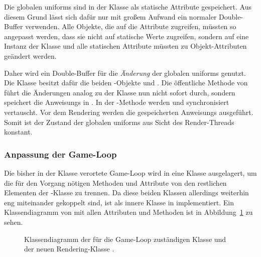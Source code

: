 Die globalen \glspl{uniform} sind in der Klasse \classGlobalUniforms{} als statische Attribute gespeichert. Aus diesem Grund lässt sich dafür nur mit großem Aufwand ein normaler Double-Buffer verwenden. Alle Objekte, die auf die Attribute zugreifen, müssten so angepasst werden, dass sie nicht auf statische Werte zugreifen, sondern auf eine Instanz der Klasse und alle statischen Attribute müssten zu Objekt-Attributen geändert werden.

Daher wird ein Double-Buffer für die \emph{Änderung} der globalen \glspl{uniform} genutzt. Die Klasse \classMasterRenderer{} besitzt dafür die beiden \classRunnable{}-Objekte  und . Die öffentliche Methode  von \classMasterRenderer{} führt die Änderungen analog zu der Klasse \classLoader{} nun nicht sofort durch, sondern speichert die \glspl{Anweisung} in . In der -Methode werden  und  synchronisiert vertauscht. Vor dem Rendering werden die gespeicherten \glspl{Anweisung} ausgeführt. Somit ist der Zustand der globalen \glspl{uniform} aus Sicht des Render-Threads konstant.

\subsubsection{Anpassung der Game-Loop}\label{sec:adjustGameLoop}
Die bisher in der Klasse \classGame{} verortete Game-Loop wird in eine Klasse \classGameLoop{} ausgelagert, um die für den Vorgang nötigen Methoden und Attribute von den restlichen Elementen der \classGame{}-Klasse zu trennen. Da diese beiden Klassen allerdings weiterhin eng miteinander gekoppelt sind, ist \classGameLoop{} als innere Klasse in \classGame{} implementiert. Ein Klassendiagramm von  \classGameLoop{} mit allen Attributen und Methoden ist in Abbildung~\ref{fig:DiagGameLoop} zu sehen.

\begin{figure}[htbp]
	\centering
	
	\caption[Klassendiagramm von \classGameLoop{} und \classRenderThread{}.]{Klassendiagramm der für die Game-Loop zuständigen Klasse \classGameLoop{} und der neuen Rendering-Klasse \classRenderThread{}.}\label{fig:DiagGameLoop}
\end{figure}

